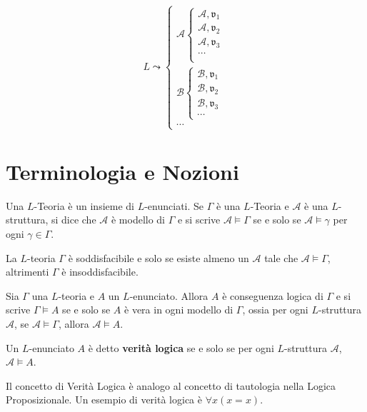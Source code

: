 $$
L \leadsto 
\begin{cases}
        \mathcal{A} \begin{cases}
                \mathcal{A}, \mathfrak{v}_1 \\
                \mathcal{A}, \mathfrak{v}_2 \\
                \mathcal{A}, \mathfrak{v}_3 \\
                \cdots \\
        \end{cases} \\
        \mathcal{B} \begin{cases}
                \mathcal{B}, \mathfrak{v}_1\\
                \mathcal{B}, \mathfrak{v}_2\\
                \mathcal{B}, \mathfrak{v}_3\\
                \cdots                     
        \end{cases} \\
        \cdots
\end{cases}
$$

\section{Terminologia e Nozioni}

\begin{defi}[$L$-Teoria]
        Una $L$-Teoria è un insieme di $L$-enunciati. 
        Se $\Gamma$ è una $L$-Teoria e $\mathcal{A}$ è una $L$-struttura, 
        si dice che $\mathcal{A}$ è modello di $\Gamma$ e si scrive 
        $\mathcal{A} \models \Gamma$ se e solo se $\mathcal{A} \models \gamma$ 
        per ogni $\gamma \in \Gamma$. 

        La $L$-teoria $\Gamma$ è soddisfacibile e solo se esiste almeno un 
        $\mathcal{A}$ tale che $\mathcal{A} \models \Gamma$, 
        altrimenti $\Gamma$ è insoddisfacibile.

        Sia $\Gamma$ una $L$-teoria e $A$ un $L$-enunciato. 
        Allora $A$ è conseguenza logica di $\Gamma$ e si scrive $\Gamma \models A$ 
        se e solo se $A$ è vera in ogni modello di $\Gamma$, ossia 
        per ogni $L$-struttura $\mathcal{A}$, se $\mathcal{A} \models \Gamma$, 
        allora $\mathcal{A} \models A$. 
\end{defi}

\begin{defi}
        Un $L$-enunciato $A$ è detto \textbf{verità logica} se e solo se 
        per ogni $L$-struttura $\mathcal{A}$, $\mathcal{A} \models A$. 
\end{defi}
Il concetto di Verità Logica è analogo al concetto di tautologia nella 
Logica Proposizionale. 
Un esempio di verità logica è $\forall x (x = x)$. 

